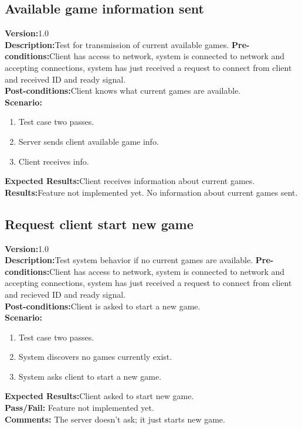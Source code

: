 \documentclass[12pt]{article}
\begin{document}
\subsection{Available game information sent}
\textbf{Version:}1.0\\
\textbf{Description:}Test for transmission of current available games.
\textbf{Pre-conditions:}Client has access to network, system is connected to network and accepting connections, system has just received a request to connect from client and received ID and ready signal.\\
\textbf{Post-conditions:}Client knows what current games are available.\\
\textbf{Scenario:}
\begin{enumerate}
 \item Test case two passes.
 \item Server sends client available game info.
 \item Client receives info.
\end{enumerate}
\textbf{Expected Results:}Client receives information about current games.\\
\textbf{Results:}Feature not implemented yet. No information about current games sent.\\


\subsection{Request client start new game}
\textbf{Version:}1.0\\
\textbf{Description:}Test system behavior if no current games are available.
\textbf{Pre-conditions:}Client has access to network, system is connected to network and accepting connections, system has just received a request to connect from client and recieved ID and ready signal.\\
\textbf{Post-conditions:}Client is asked to start a new game.\\
\textbf{Scenario:}
\begin{enumerate}
 \item Test case two passes.
 \item System discovers no games currently exist.
 \item System asks client to start a new game.
\end{enumerate}
\textbf{Expected Results:}Client asked to start new game.\\
\textbf{Pass/Fail:} Feature not implemented yet. \\
\textbf{Comments:} The server doesn't ask; it just starts new game.\\
\end{document}
